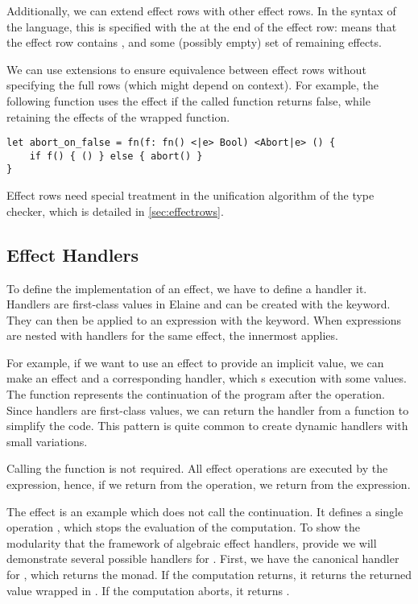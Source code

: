 Additionally, we can extend effect rows with other effect rows. In the syntax of the language, this is specified with the \el{|} at the end of the effect row:  means that the effect row contains ,  and some (possibly empty) set of remaining effects.

We can use extensions to ensure equivalence between effect rows without specifying the full rows (which might depend on context). For example, the following function uses the  effect if the called function returns false, while retaining the effects of the wrapped function.

\begin{lstlisting}[language=elaine, style=fancy]
let abort_on_false = fn(f: fn() <|e> Bool) <Abort|e> () {
    if f() { () } else { abort() }
}
\end{lstlisting}

Effect rows need special treatment in the unification algorithm of the type checker, which is detailed in \cref{sec:effectrows}.

\subsection{Effect Handlers}\label{sec:alghandlers}

To define the implementation of an effect, we have to define a handler it. Handlers are first-class values in Elaine and can be created with the  keyword. They can then be applied to an expression with the  keyword. When  expressions are nested with handlers for the same effect, the innermost  applies.

For example, if we want to use an effect to provide an implicit value, we can make an effect  and a corresponding handler, which s execution with some values. The  function represents the continuation of the program after the operation. Since handlers are first-class values, we can return the handler from a function to simplify the code. This pattern is quite common to create dynamic handlers with small variations.


Calling the  function is not required. All effect operations are executed by the  expression, hence, if we return from the operation, we return from the  expression.

The  effect is an example which does not call the continuation. It defines a single operation , which stops the evaluation of the computation. To show the modularity that the framework of algebraic effect handlers, provide we will demonstrate several possible handlers for . First, we have the canonical handler for , which returns the  monad. If the computation returns, it returns the returned value wrapped in . If the computation aborts, it returns .

